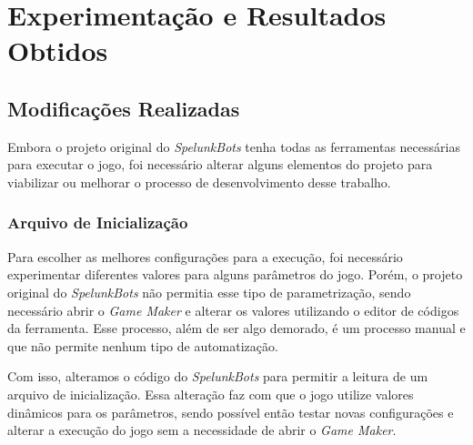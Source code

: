 \chapter{\label{chap:experimentation-and-results}Experimentação e Resultados Obtidos}


\section{\label{section:modifications}Modificações Realizadas}


Embora o projeto original do \textit{SpelunkBots} tenha todas as ferramentas
necessárias para executar o jogo, foi necessário alterar alguns elementos do
projeto para viabilizar ou melhorar o processo de desenvolvimento desse
trabalho.

\subsection{Arquivo de Inicialização}

Para escolher as melhores configurações para a execução, foi necessário
experimentar diferentes valores para alguns parâmetros do jogo. Porém, o
projeto original do \textit{SpelunkBots} não permitia esse tipo de
parametrização, sendo necessário abrir o \textit{Game Maker} e alterar os
valores utilizando o editor de códigos da ferramenta. Esse processo, além de ser
algo demorado, é um processo manual e que não permite nenhum tipo de
automatização.

Com isso, alteramos o código do \textit{SpelunkBots} para permitir a leitura de
um arquivo de inicialização. Essa alteração faz com que o jogo utilize
valores dinâmicos para os parâmetros, sendo possível então testar novas
configurações e alterar a execução do jogo sem a necessidade de abrir o
\textit{Game Maker}.

